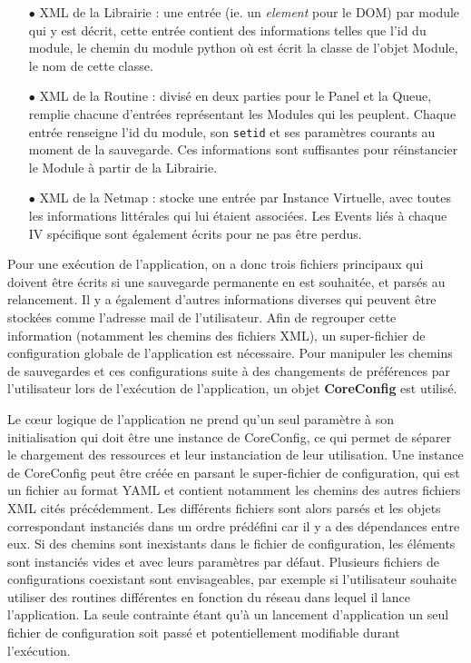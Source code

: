 \documentclass[]{article}
\begin{document}
\begin{itemize}
\item[$\bullet$] XML de la Librairie : une entrée (ie. un \textit{element} pour le DOM) par module qui y est décrit, cette entrée contient des informations telles que l'id du module, le chemin du module python où est écrit la classe de l'objet Module, le nom de cette classe.
\vspace{0.2cm}
\item[$\bullet$] XML de la Routine : divisé en deux parties pour le Panel et la Queue, remplie chacune d'entrées représentant les Modules qui les peuplent. Chaque entrée renseigne l'id du module, son \texttt{setid} et ses paramètres courants au moment de la sauvegarde. Ces informations sont suffisantes pour réinstancier le Module à partir de la Librairie.\\

\item[$\bullet$] XML de la Netmap : stocke une entrée par Instance Virtuelle, avec toutes les informations littérales qui lui étaient associées. Les Events liés à chaque IV spécifique sont également écrits pour ne pas être perdus. 
\end{itemize}
\vspace{0.2cm}

\par Pour une exécution de l'application, on a donc trois fichiers principaux qui doivent être écrits si une sauvegarde permanente en est souhaitée, et parsés au relancement. Il y a également d'autres informations diverses qui peuvent être stockées comme l'adresse mail de l'utilisateur. Afin de regrouper cette information (notamment les chemins des fichiers XML), un super-fichier de configuration globale de l'application est nécessaire. Pour manipuler les chemins de sauvegardes et ces configurations suite à des changements de préférences par l'utilisateur lors de l'exécution de l'application, un objet \textbf{CoreConfig} est utilisé.\\

\par Le cœur logique de l'application ne prend qu'un seul paramètre à son initialisation qui doit être une instance de CoreConfig, ce qui permet de séparer le chargement des ressources et leur instanciation de leur utilisation. Une instance de CoreConfig peut être créée en parsant le super-fichier de configuration, qui est un fichier au format YAML et contient notamment les chemins des autres fichiers XML cités précédemment. Les différents fichiers sont alors parsés et les objets correspondant instanciés dans un ordre prédéfini car il y a des dépendances entre eux. Si des chemins sont inexistants dans le fichier de configuration, les éléments sont instanciés vides et avec leurs paramètres par défaut. Plusieurs fichiers de configurations coexistant sont envisageables, par exemple si l'utilisateur souhaite utiliser des routines différentes en fonction du réseau dans lequel il lance l'application. La seule contrainte étant qu'à un lancement d'application un seul fichier de configuration soit passé et potentiellement modifiable durant l'exécution.
\end{document}
